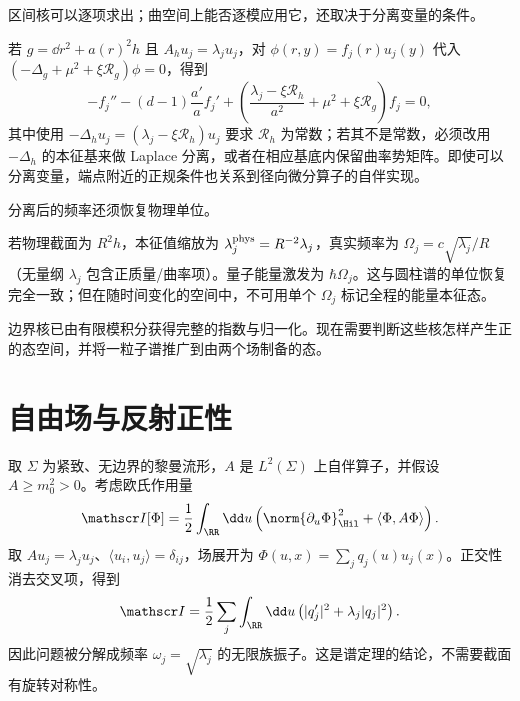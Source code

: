 区间核可以逐项求出；曲空间上能否逐模应用它，还取决于分离变量的条件。

若 $g=\dd r^2+a(r)^2h$ 且 $A_hu_j=\lambda_ju_j$，对 $\phi(r,y)=f_j(r)u_j(y)$ 代入
$(-\Delta_g+\mu^2+\xi\mathcal R_g)\phi=0$，得到
\[
 -f_j''-(d-1)\frac{a'}a f_j'
 +\left(\frac{\lambda_j-\xi\mathcal R_h}{a^2}
 +\mu^2+\xi\mathcal R_g\right)f_j=0,
\]
其中使用 $-\Delta_hu_j=(\lambda_j-\xi\mathcal R_h)u_j$ 要求 $\mathcal R_h$ 为常数；若其不是常数，必须改用 $-\Delta_h$ 的本征基来做 Laplace 分离，或者在相应基底内保留曲率势矩阵。即使可以分离变量，端点附近的正规条件也关系到径向微分算子的自伴实现。

分离后的频率还须恢复物理单位。

若物理截面为 $R^2h$，本征值缩放为 $\lambda_j^{\rm phys}=R^{-2}\lambda_j$，真实频率为 $\Omega_j=c\sqrt{\lambda_j}/R$（无量纲 $\lambda_j$ 包含正质量/曲率项）。量子能量激发为 $\hbar\Omega_j$。这与圆柱谱的单位恢复完全一致；但在随时间变化的空间中，不可用单个 $\Omega_j$ 标记全程的能量本征态。








边界核已由有限模积分获得完整的指数与归一化。现在需要判断这些核怎样产生正的态空间，并将一粒子谱推广到由两个场制备的态。


\section{自由场与反射正性}
\label{sec:ghs-free-reflection-positivity}


取 $\Sigma$ 为紧致、无边界的黎曼流形，$A$ 是 $L^2(\Sigma)$ 上自伴算子，并假设 $A\geq m_0^2>0$。考虑欧氏作用量
\begin{equation}\label{eq:ghs-general-cylinder-action}
 \mathscr I[\Phi]=\frac12\int_{\RR}\dd u
 \left(\norm{\partial_u\Phi}_{\Hil}^2+\langle\Phi,A\Phi\rangle\right).
\end{equation}
取 $Au_j=\lambda_ju_j$、$\langle u_i,u_j\rangle=\delta_{ij}$，场展开为 $\Phi(u,x)=\sum_jq_j(u)u_j(x)$。正交性消去交叉项，得到
\[
 \mathscr I=\frac12\sum_j\int_\RR\dd u
 \left(|q'_j|^2+\lambda_j|q_j|^2\right).
\]
因此问题被分解成频率 $\omega_j=\sqrt{\lambda_j}$ 的无限族振子。这是谱定理的结论，不需要截面有旋转对称性。

